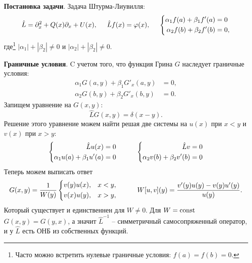 
\textbf{Постановка задачи}. 
Задача Штурма-Лиувилля:
\begin{equation*}
    \hat{L} = \partial_x^2 + Q(x) \partial_x + U(x),
    \hspace{5 mm} 
    \hat{L} f(x) = \varphi(x),
    \hspace{5 mm} 
    \left\{\begin{aligned}
        \alpha_1 f(a) + \beta_1 f'(a) &= 0 \\
        \alpha_2 f(b) + \beta_2 f'(b) &= 0,
    \end{aligned}\right.
\end{equation*}
где\footnote{
    Часто можно встретить нулевые граничные условия: $f(a) = f(b) = 0$. 
}  $|\alpha_1| + |\beta_2| \neq 0$ и $|\alpha_2| + |\beta_2| \neq 0$.

\textbf{Граничные условия}.  C учетом того, что функция Грина $G$ наследует граничные условия:
\begin{align*}
    \alpha_1 G(a, y) + \beta_1 G'_x (a, y) &= 0, \\
    \alpha_2 G(b, y) + \beta_2 G'_x (b, y) &= 0.
\end{align*}
Запищем уравнение на $G(x, y)$:
\begin{equation*}
    \hat{L} G(x, y) = \delta(x-y).
\end{equation*}
Решение этого уравнение можем найти решая две системы на $u(x)$ при $x < y$ и $v(x)$ при $x > y$:
\begin{equation*}
\left\{\begin{aligned}
        \hat{L} u(x) &= 0 \\
        \alpha_1 u(a) + \beta_1 u'(a) &= 0
    \end{aligned}\right.
    \hspace{10 mm} 
    \left\{\begin{aligned}
        \hat{L} v &= 0 \\
        \alpha_2 v(b) + \beta_2 v'(b) &= 0
    \end{aligned}\right.
\end{equation*}
Теперь можем выписать ответ
\begin{equation*}
    G(x, y) = \frac{1}{W(y)} \left\{\begin{aligned}
        &v(y) u(x), &x < y, \\
        &v(x) u(y), &x > y,
    \end{aligned}\right.
    \hspace{10 mm} 
    W[u, v](y) = \frac{v' (y) u(y) - v(y) u'(y)}{u(y)}.
\end{equation*}
Который существует и единственнен для $W \neq 0$. Для $W = \textnormal{const} $ $G(x, y) = G(y, x)$, а значит $\hat{L}^{-1}$ -- симметричный самосопряженный оператор, и у $\hat{L}$ есть ОНБ из собственных функций. 


